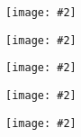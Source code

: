 \documentclass[landscape,a0b,final]{a0poster}
\newenvironment{poster}{
  \begin{center}
  \begin{minipage}[c]{0.98\textwidth}
}{
  \end{minipage} 
  \end{center}
}
\newcommand{\myfig}[3][0]{
\begin{center}
  \vspace{1.5cm}
  \texttt{[image: \#2]}
  \nobreak\medskip
\end{center}}
\begin{document}
\begin{poster}
\begin{multicols}{3}
\begin{multicols}{2}
  \begin{center}
  \myfig{c_spectrum_375_2_36_2_lowin.ps}{1.0}
  \end{center}
  \end{multicols}
  \vspace{-3.0cm}
  \setlength{\columnsep}{0pt}
  \setlength{\columnseprule}{0pt}
  \hspace{-2cm}
  \begin{multicols}{2}
  \begin{center}
  \myfig{c_spectrum_350_2_36_2_highin.ps}{1.0}
  \end{center}

  \begin{center}
  \myfig{c_spectrum_350_2_36_2_lowin.ps}{1.0}
  \end{center}
  \end{multicols}

  \vspace{-3.0cm}
  \setlength{\columnsep}{0pt}
  \setlength{\columnseprule}{0pt}
  \hspace{-2cm}
  \begin{multicols}{2}
  \begin{center}
  \myfig{c_spectrum_350_3_34_3_highin.ps}{1.0}
  \end{center}

  \begin{center}
  \myfig{c_spectrum_350_4_32_4_highin.ps}{1.0}
  \end{center}
  \end{multicols}

\nocite{*}


\end{multicols}

\end{poster}
\end{document}
